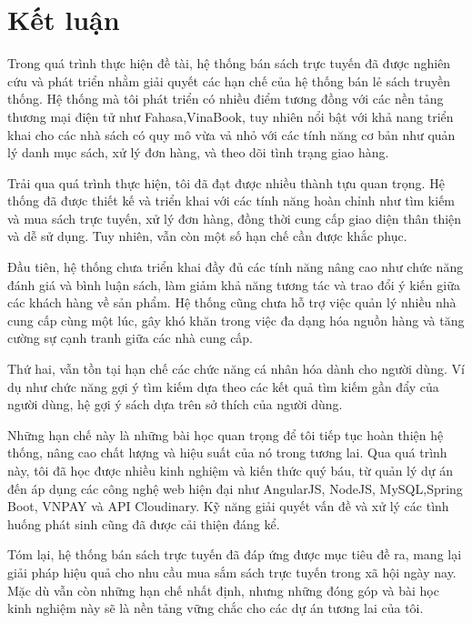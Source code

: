 \documentclass[../DoAn.tex]{subfiles}
\begin{document}
\section{Kết luận}
\label{section:6.1}


Trong quá trình thực hiện đề tài, hệ thống bán sách trực tuyến đã được nghiên cứu và phát triển nhằm giải quyết các hạn chế của hệ thống bán lẻ sách truyền thống. Hệ thống mà tôi phát triển có nhiều điểm tương đồng với các nền tảng thương mại điện tử như Fahasa,VinaBook, tuy nhiên nổi bật với khả nang triển khai cho các nhà sách có quy mô vừa vả nhỏ với các tính năng cơ bản như quản lý danh mục sách, xử lý đơn hàng, và theo dõi tình trạng giao hàng.

Trải qua quá trình thực hiện, tôi đã đạt được nhiều thành tựu quan trọng. Hệ thống đã được thiết kế và triển khai với các tính năng hoàn chỉnh như tìm kiếm và mua sách trực tuyến, xử lý đơn hàng, đồng thời cung cấp giao diện thân thiện và dễ sử dụng. Tuy nhiên, vẫn còn một số hạn chế cần được khắc phục.

Đầu tiên, hệ thống chưa triển khai đầy đủ các tính năng nâng cao như chức năng đánh giá và bình luận sách, làm giảm khả năng tương tác và trao đổi ý kiến giữa các khách hàng về sản phẩm. Hệ thống cũng chưa hỗ trợ việc quản lý nhiều nhà cung cấp cùng một lúc, gây khó khăn trong việc đa dạng hóa nguồn hàng và tăng cường sự cạnh tranh giữa các nhà cung cấp.

Thứ hai, vẫn tồn tại hạn chế các chức năng cá nhân hóa dành cho người dùng. Ví dụ như chức năng gợi ý tìm kiếm dựa theo các kết quả tìm kiếm gần đẩy của người dùng, hệ gợi ý sách dựa trên sở thích của người dùng.

Những hạn chế này là những bài học quan trọng để tôi tiếp tục hoàn thiện hệ thống, nâng cao chất lượng và hiệu suất của nó trong tương lai. Qua quá trình này, tôi đã học được nhiều kinh nghiệm và kiến thức quý báu, từ quản lý dự án đến áp dụng các công nghệ web hiện đại như AngularJS, NodeJS, MySQL,Spring Boot, VNPAY và API Cloudinary. Kỹ năng giải quyết vấn đề và xử lý các tình huống phát sinh cũng đã được cải thiện đáng kể.

Tóm lại, hệ thống bán sách trực tuyến đã đáp ứng được mục tiêu đề ra, mang lại giải pháp hiệu quả cho nhu cầu mua sắm sách trực tuyến trong xã hội ngày nay. Mặc dù vẫn còn những hạn chế nhất định, nhưng những đóng góp và bài học kinh nghiệm này sẽ là nền tảng vững chắc cho các dự án tương lai của tôi.
\end{document}
